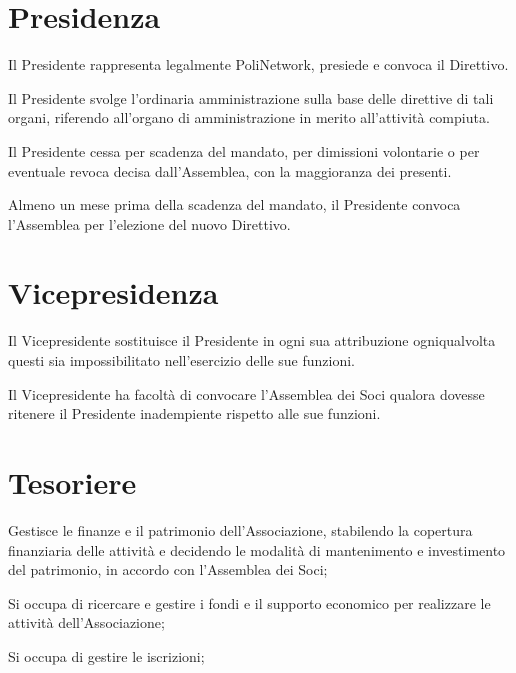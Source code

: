 \documentclass[legalpaper, 11pt]{exam}
\let\tempone\enumerate
\let\temptwo\endenumerate
\renewenvironment{enumerate}{\tempone\addtolength{\itemsep}{-0.45\baselineskip}}{\temptwo}
\begin{document}
{\section{Presidenza}
\begin{enumerate}
 \item Il Presidente rappresenta legalmente PoliNetwork, presiede e convoca il Direttivo.
 \item Il Presidente svolge l’ordinaria amministrazione sulla base delle direttive di tali organi, riferendo all’organo di amministrazione in merito all’attività compiuta.
 \item Il Presidente cessa per scadenza del mandato, per dimissioni volontarie o per eventuale revoca decisa dall’Assemblea, con la maggioranza dei presenti.
 \item Almeno un mese prima della scadenza del mandato, il Presidente convoca l’Assemblea per l’elezione del nuovo Direttivo.
\end{enumerate}

\section{Vicepresidenza}
\begin{enumerate}
 \item Il Vicepresidente sostituisce il Presidente in ogni sua attribuzione ogniqualvolta questi sia impossibilitato nell’esercizio delle sue funzioni.
 \item Il Vicepresidente ha facoltà di convocare l’Assemblea dei Soci qualora dovesse ritenere il Presidente inadempiente rispetto alle sue funzioni.
\end{enumerate}

\section{Tesoriere}
\begin{enumerate}
	\item Gestisce le finanze e il patrimonio dell’Associazione, stabilendo la copertura finanziaria delle attività e decidendo le modalità di mantenimento e investimento del patrimonio, in accordo con l’Assemblea dei Soci;
	\item Si occupa di ricercare e gestire i fondi e il supporto economico per realizzare le attività dell’Associazione;
	\item Si occupa di gestire le iscrizioni;
\end{enumerate}

}
\end{document}
